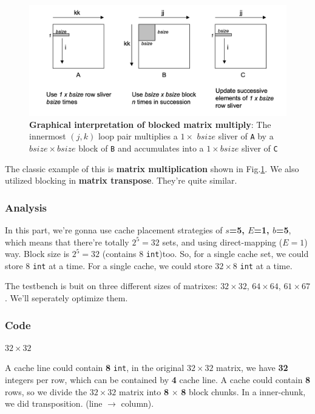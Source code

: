 \documentclass{article}
\begin{document}
\begin{figure}[!h]
	\centering
	\includegraphics[width=0.8\linewidth]{r3}
	\caption{\textbf{Graphical interpretation of blocked matrix multiply}: The innermost $ (j, k) $ loop pair multiplies a $ 1 \times $ $ bsize $ sliver of \lstinline|A| by a $ bsize \times bsize $ block of \lstinline|B| and accumulates into a $ 1 \times bsize $ sliver of \lstinline|C|}
	\label{fig:r3}
\end{figure}

The classic example of this is \textbf{matrix multiplication} shown in Fig.\ref{fig:r3}. We also utilized blocking in \textbf{matrix transpose}. They're quite similar.

\subsubsection{Analysis}

In this part, we're gonna use cache placement strategies of \textbf{$ s $=5, $ E $=1, $ b $=5}, which means that there're totally $ 2^5 = 32 $ sets, and using direct-mapping ($ E=1 $) way. Block size is $ 2^5=32 $ (contains $ 8 $ \lstinline|int|)too. So, for a single cache set, we could store $ 8 $ \lstinline|int| at a time. For a single cache, we could store $ 32 \times 8 $ \lstinline|int| at a time. 

The testbench is buit on three different sizes of matrixes: $ 32 \times 32 $, $ 64 \times 64 $, $ 61 \times 67 $. We'll seperately optimize them.

\subsubsection{Code}

{\color{blue} $ 32 \times 32 $}

A cache line could contain \textbf{8} \lstinline|int|, in the original $ 32 \times 32 $ matrix, we have \textbf{32} integers per row, which can be contained by \textbf{4} cache line. A cache could contain \textbf{8} rows, so we divide the $ 32 \times 32 $ matrix into \textbf{8} $\times$ \textbf{8} block chunks. In a inner-chunk, we did transposition. (line $\rightarrow$ column).
\end{document}
